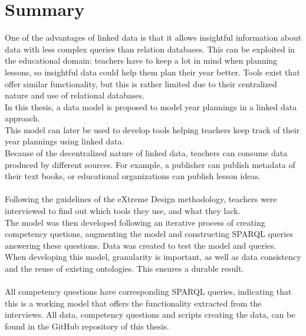 \chapter*{Summary}
\noindent One of the advantages of linked data is that it allows insightful information about data with less complex queries than relation databases.
This can be exploited in the educational domain: teachers have to keep a lot in mind when planning lessons, so insightful data could help them plan their year better.
Tools exist that offer similar functionality, but this is rather limited due to their centralized nature and use of relational databases.\\
In this thesis, a data model is proposed to model year plannings in a linked data approach.\\
This model can later be used to develop tools helping teachers keep track of their year plannings using linked data.\\
Because of the decentralized nature of linked data, teachers can consume data produced by different sources.
For example, a publisher can publish metadata of their text books, or educational organizations can publish lesson ideas.\\ \\
Following the guidelines of the eXtreme Design methodology, teachers were interviewed to find out which tools they use, and what they lack.\\
The model was then developed following an iterative process of creating competency quetions, augmenting the model and constructing SPARQL queries answering these questions.
Data was created to test the model and queries.\\ 
When developing this model, granularity is important, as well as data consistency and the reuse of existing ontologies. This ensures a durable result.\\ \\
All competency questions have corresponding SPARQL queries, indicating that this is a working model that offers the functionality extracted from the interviews.
All data, competency questions and scripts creating the data, can be found in the GitHub repository of this thesis.
